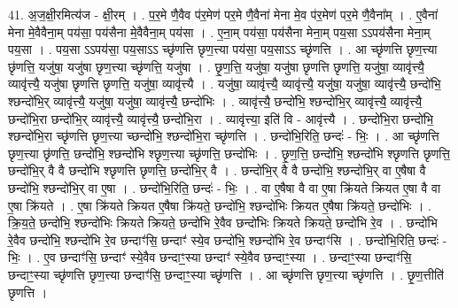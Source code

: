 \documentclass[17pt]{extarticle}
\begin{document}
41. अ॒ज॒क्षी॒रमित्य॑ज - क्षी॒रम् । . प॒र॒मे णै॒वैव प॑र॒मेण॑ पर॒मे णै॒वैना॑ मेना मे॒व प॑र॒मेण॑ पर॒मे णै॒वैना᳚म् । . ए॒वैना॑ मेना मे॒वैवैना॒म् पय॑सा॒ पय॑सैना मे॒वैवैना॒म् पय॑सा । . ए॒ना॒म् पय॑सा॒ पय॑सैना मेना॒म् पय॒सा ऽऽपय॑सैना मेना॒म् पय॒सा । . पय॒सा ऽऽपय॑सा॒ पय॒साऽऽ च्छृ॑णत्ति छृण॒त्त्या पय॑सा॒ पय॒साऽऽ च्छृ॑णत्ति । . आ च्छृ॑णत्ति छृण॒त्त्या छृ॑णत्ति॒ यजु॑षा॒ यजु॑षा छृण॒त्त्या च्छृ॑णत्ति॒ यजु॑षा । . छृ॒ण॒त्ति॒ यजु॑षा॒ यजु॑षा छृणत्ति छृणत्ति॒ यजु॑षा॒ व्यावृ॑त्त्यै॒ व्यावृ॑त्त्यै॒ यजु॑षा छृणत्ति छृणत्ति॒ यजु॑षा॒ व्यावृ॑त्त्यै । . यजु॑षा॒ व्यावृ॑त्त्यै॒ व्यावृ॑त्त्यै॒ यजु॑षा॒ यजु॑षा॒ व्यावृ॑त्त्यै॒ छन्दो॑भि॒ श्छन्दो॑भि॒र् व्यावृ॑त्त्यै॒ यजु॑षा॒ यजु॑षा॒ व्यावृ॑त्त्यै॒ छन्दो॑भिः । . व्यावृ॑त्त्यै॒ छन्दो॑भि॒ श्छन्दो॑भि॒र् व्यावृ॑त्त्यै॒ व्यावृ॑त्त्यै॒ छन्दो॑भि॒रा छन्दो॑भि॒र् व्यावृ॑त्त्यै॒ व्यावृ॑त्त्यै॒ छन्दो॑भि॒रा । . व्यावृ॑त्त्या॒ इति॑ वि - आवृ॑त्त्यै । . छन्दो॑भि॒रा छन्दो॑भि॒ श्छन्दो॑भि॒रा च्छृ॑णत्ति छृण॒त्त्या च्छन्दो॑भि॒ श्छन्दो॑भि॒रा च्छृ॑णत्ति । . छन्दो॑भि॒रिति॒ छन्दः॑ - भिः॒ । . आ च्छृ॑णत्ति छृण॒त्त्या छृ॑णत्ति॒ छन्दो॑भि॒ श्छन्दो॑भि श्छृण॒त्त्या च्छृ॑णत्ति॒ छन्दो॑भिः । . छृ॒ण॒त्ति॒ छन्दो॑भि॒ श्छन्दो॑भि श्छृणत्ति छृणत्ति॒ छन्दो॑भि॒र् वै वै छन्दो॑भि श्छृणत्ति छृणत्ति॒ छन्दो॑भि॒र् वै । . छन्दो॑भि॒र् वै वै छन्दो॑भि॒ श्छन्दो॑भि॒र् वा ए॒षैषा वै छन्दो॑भि॒ श्छन्दो॑भि॒र् वा ए॒षा । . छन्दो॑भि॒रिति॒ छन्दः॑ - भिः॒ । . वा ए॒षैषा वै वा ए॒षा क्रि॑यते क्रियत ए॒षा वै वा ए॒षा क्रि॑यते । . ए॒षा क्रि॑यते क्रियत ए॒षैषा क्रि॑यते॒ छन्दो॑भि॒ श्छन्दो॑भिः क्रियत ए॒षैषा क्रि॑यते॒ छन्दो॑भिः । . क्रि॒य॒ते॒ छन्दो॑भि॒ श्छन्दो॑भिः क्रियते क्रियते॒ छन्दो॑भि रे॒वैव छन्दो॑भिः क्रियते क्रियते॒ छन्दो॑भि रे॒व । . छन्दो॑भि रे॒वैव छन्दो॑भि॒ श्छन्दो॑भि रे॒व छन्दाꣳ॑सि॒ छन्दाꣳ॑ स्ये॒व छन्दो॑भि॒ श्छन्दो॑भि रे॒व छन्दाꣳ॑सि । . छन्दो॑भि॒रिति॒ छन्दः॑ - भिः॒ । . ए॒व छन्दाꣳ॑सि॒ छन्दाꣳ॑ स्ये॒वैव छन्दाꣳ॒॒स्या छन्दाꣳ॑ स्ये॒वैव छन्दाꣳ॒॒स्या । . छन्दाꣳ॒॒स्या छन्दाꣳ॑सि॒ छन्दाꣳ॒॒स्या च्छृ॑णत्ति छृण॒त्त्या छन्दाꣳ॑सि॒ छन्दाꣳ॒॒स्या च्छृ॑णत्ति । . आ च्छृ॑णत्ति छृण॒त्त्या च्छृ॑णत्ति । . छृ॒ण॒त्तीति॑ छृणत्ति । \newline
\pagebreak
{}
\end{document}

